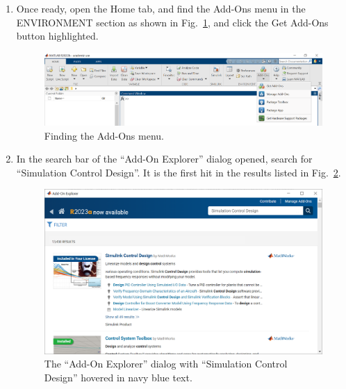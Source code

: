 \documentclass[12pt]{article}
\begin{document}
\begin{enumerate}
    \item
        Once ready,
        open the Home tab,
        and find the Add-Ons menu in the ENVIRONMENT section
        as shown in Fig.~\ref{fig:finding addons},
        and click the Get Add-Ons button highlighted.

        \begin{figure}
            \centering
            \includegraphics[width=\linewidth]{img/intro_010_finding_addons.png}
            \caption{Finding the Add-Ons menu.}
            \label{fig:finding addons}
        \end{figure}

    \item
        In the search bar of the ``Add-On Explorer'' dialog opened,
        search for ``Simulation Control Design''.
        It is the first hit in the results listed in Fig.~\ref{fig:searching simulink control design}.

        \begin{figure}
            \centering
            \includegraphics[width=\linewidth]{img/intro_020_searching_simulink_control_design.png}
            \caption{The ``Add-On Explorer'' dialog with ``Simulation Control Design'' hovered in navy blue text.}
            \label{fig:searching simulink control design}
        \end{figure}


\end{enumerate}
\end{document}
